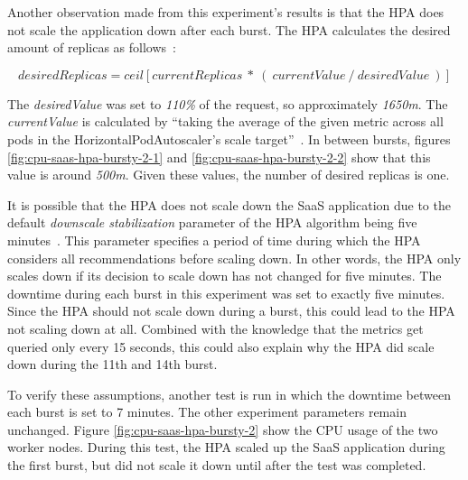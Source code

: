 Another observation made from this experiment's results is that the HPA does not scale the application down after each burst. The HPA calculates the desired amount of replicas as follows~\citep{hpa-algorithm-details}:

\[ desiredReplicas = ceil[currentReplicas\ *\ (\ currentValue\ /\ desiredValue\ )] \]

The \textit{desiredValue} was set to \textit{110\%} of the request, so approximately \textit{1650m}. The \textit{currentValue} is calculated by ``taking the average of the given metric across all pods in the HorizontalPodAutoscaler's scale target''~\citep{hpa-algorithm-details}. In between bursts, figures \ref{fig:cpu-saas-hpa-bursty-2-1} and \ref{fig:cpu-saas-hpa-bursty-2-2} show that this value is around \textit{500m}. Given these values, the number of desired replicas is one.

It is possible that the HPA does not scale down the SaaS application due to the default \textit{downscale stabilization} parameter of the HPA algorithm being five minutes~\citep{hpa-cooldown-delay}. This parameter specifies a period of time during which the HPA considers all recommendations before scaling down. In other words, the HPA only scales down if its decision to scale down has not changed for five minutes. The downtime during each burst in this experiment was set to exactly five minutes. Since the HPA should not scale down during a burst, this could lead to the HPA not scaling down at all. Combined with the knowledge that the metrics get queried only every 15 seconds, this could also explain why the HPA did scale down during the 11th and 14th burst.

To verify these assumptions, another test is run in which the downtime between each burst is set to 7 minutes. The other experiment parameters remain unchanged. Figure \ref{fig:cpu-saas-hpa-bursty-2} show the CPU usage of the two worker nodes. During this test, the HPA scaled up the SaaS application during the first burst, but did not scale it down until after the test was completed. 

